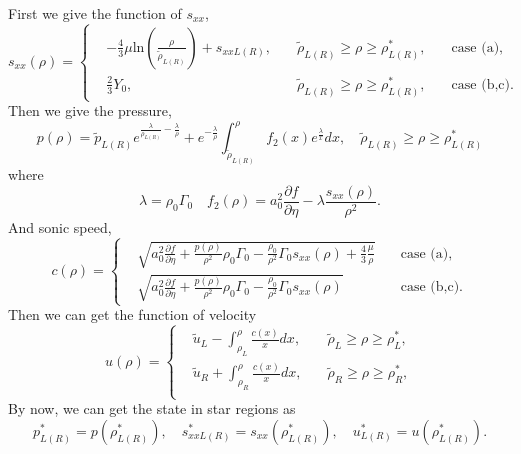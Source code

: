 \documentclass{article}
\numberwithin{equation}{section}
\numberwithin{table}{section}
\begin{document}
First we give the function of $s_{xx}$,
\begin{equation}
  s_{xx}(\rho) = \left\{\begin{aligned}
	  & -\frac{4}{3}\mu\text{ln}\left(\frac{\rho}{\tilde{\rho}_{L(R)}}\right)+s_{xxL(R)}, \quad & \tilde{\rho}_{L(R)} \ge \rho \ge \rho_{L(R)}^*,  \quad &\text{case (a)},\\
	  & \frac{2}{3}Y_0,  \quad & \tilde{\rho}_{L(R)} \ge \rho \ge \rho_{L(R)}^*,  \quad &\text{case (b,c)}.
  \end{aligned} \right.
  \end{equation}
Then we give the pressure,
\begin{equation}
  p(\rho)=\tilde{p}_{L(R)}e^{\frac{\lambda}{\rho_{L(R)}}-\frac{\lambda}{\rho}} +e^{-\frac{\lambda}{\rho}}\int_{\tilde{\rho}_{L(R)}}^{\rho} f_2(x) e^{\frac{\lambda}{x}}dx, \quad   \tilde{\rho}_{L(R)} \ge \rho \ge \rho_{L(R)}^*
\end{equation}
where
\begin{equation}
  \lambda = \rho_0 \Gamma_0 \quad f_2(\rho) = a_0^2\frac{\partial f}{\partial \eta}- \lambda\frac{s_{xx}(\rho)}{\rho^2}.
\end{equation}
And sonic speed,
\begin{equation}
  c(\rho) = \left\{ \begin{aligned}
	&  \sqrt{a_0^2 \frac{\partial f}{\partial \eta} + \frac{p(\rho)}{\rho^2}\rho_0\Gamma_0 -\frac{\rho_0}{\rho^2}\Gamma_0 s_{xx}(\rho) +\frac{4}{3}\frac{\mu}{\rho}} \quad & \text{case (a)},\\
	&	\sqrt{a_0^2 \frac{\partial f}{\partial \eta} + \frac{p(\rho)}{\rho^2}\rho_0\Gamma_0 -\frac{\rho_0}{\rho^2}\Gamma_0 s_{xx}(\rho)}  \quad  & \text{case (b,c)}.
	\end{aligned}\right.
\end{equation}
Then we can get  the  function of  velocity
\begin{equation}
  u(\rho) =\left\{ \begin{aligned}
	  &\tilde{u}_L - \int_{\rho_L}^{\rho} \frac{c(x)}{x} dx, \quad  & \tilde{\rho}_L \ge \rho \ge \rho_L^*,   \\
	  &\tilde{u}_R + \int_{\rho_R}^{\rho} \frac{c(x)}{x} dx, \quad  & \tilde{\rho}_R \ge \rho \ge \rho_R^*, \\
	\end{aligned}
  \right.
\end{equation}
By now, we can get the state in star regions as
\begin{equation}
  p^*_{L(R)} = p(\rho_{L(R)}^*),\quad s_{xxL(R)}^* = s_{xx}(\rho_{L(R)}^*),\quad  u^*_{L(R)} = u(\rho_{L(R)}^*).
\end{equation}
\end{document}
